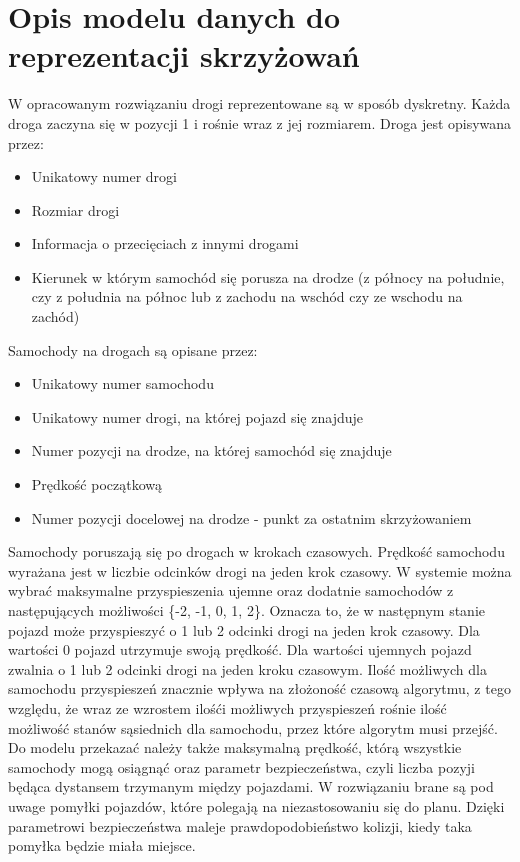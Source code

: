  \label{chap:implementation}

\section{Opis modelu danych do reprezentacji skrzyżowań}

W opracowanym rozwiązaniu drogi reprezentowane są w sposób dyskretny. Każda droga zaczyna się w pozycji 1 i rośnie wraz z jej rozmiarem. Droga jest opisywana przez:
\begin{itemize}
\item Unikatowy numer drogi
\item Rozmiar drogi
\item Informacja o przecięciach z innymi drogami
\item Kierunek w którym samochód się porusza na drodze (z północy na południe, czy z południa na północ lub z zachodu na wschód czy ze wschodu na zachód)
\end{itemize}
Samochody na drogach są opisane przez:
\begin{itemize}
\item Unikatowy numer samochodu
\item Unikatowy numer drogi, na której pojazd się znajduje
\item Numer pozycji na drodze, na której samochód się znajduje
\item Prędkość początkową
\item Numer pozycji docelowej na drodze - punkt za ostatnim skrzyżowaniem
\end{itemize}
Samochody poruszają się po drogach w krokach czasowych. Prędkość samochodu wyrażana jest w liczbie odcinków drogi na jeden krok czasowy.
\newline
\indent
W systemie można wybrać maksymalne przyspieszenia ujemne oraz dodatnie samochodów z następujących możliwości \{-2, -1, 0, 1, 2\}. Oznacza to, że w następnym stanie pojazd może przyspieszyć o 1 lub 2 odcinki drogi na jeden krok czasowy. Dla wartości 0 pojazd utrzymuje swoją prędkość. Dla wartości ujemnych pojazd zwalnia o 1 lub 2 odcinki drogi na jeden kroku czasowym. Ilość możliwych dla samochodu przyspieszeń znacznie wpływa na złożoność czasową algorytmu, z tego względu, że wraz ze wzrostem ilośći możliwych przyspieszeń rośnie ilość możliwość stanów sąsiednich dla samochodu, przez które algorytm musi przejść.        
\newline
\indent
Do modelu przekazać należy także maksymalną prędkość, którą wszystkie samochody mogą osiągnąć oraz parametr bezpieczeństwa, czyli liczba pozyji będąca dystansem trzymanym między pojazdami. W rozwiązaniu brane są pod uwage pomyłki pojazdów, które polegają na niezastosowaniu się do planu. Dzięki parametrowi bezpieczeństwa maleje prawdopodobieństwo kolizji, kiedy taka pomyłka będzie miała miejsce.

